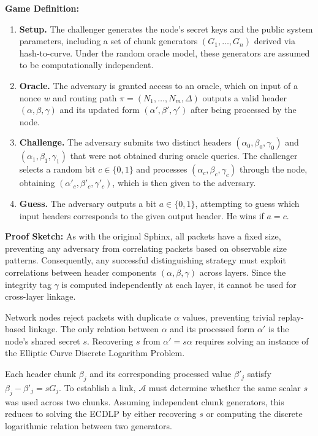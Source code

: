 \bigskip
\noindent\textbf{Game Definition:}
\begin{enumerate}[topsep=1pt, itemsep=1pt]
  \item \textbf{Setup.}
  The challenger generates the node's secret keys and the public system parameters, including a set of chunk generators $(G_1,\dots,G_n)$ derived via hash-to-curve. 
  Under the random oracle model, these generators are assumed to be computationally independent.

  \item \textbf{Oracle.}  
  The adversary is granted access to an oracle, which on input of a nonce $w$ and routing path $\pi = (N_1, \ldots, N_m, \Delta)$ outputs a valid header $(\alpha, \beta, \gamma)$ and its updated form $(\alpha', \beta', \gamma')$ after being processed by the node.

  \item \textbf{Challenge.}
  The adversary submits two distinct headers $(\alpha_0, \beta_0, \gamma_0)$ and $(\alpha_1, \beta_1, \gamma_1)$ that were not obtained during oracle queries.  
  The challenger selects a random bit $c \in \{0,1\}$ and processes $(\alpha_{c}, \beta_{c}, \gamma_{c})$ through the node, obtaining $(\alpha'_{c}, \beta'_{c}, \gamma'_{c})$, which is then given to the adversary.

  \item \textbf{Guess.}
  The adversary outputs a bit ${a} \in \{0,1\}$, attempting to guess which input headers corresponds to the given output header.  
  He wins if ${a} = {c}$.
\end{enumerate}

\medskip
\noindent\textbf{Proof Sketch:}
As with the original Sphinx, all packets have a fixed size, preventing any adversary from correlating packets based on observable size patterns.
Consequently, any successful distinguishing strategy must exploit correlations between header components $(\alpha, \beta, \gamma)$ across layers.
Since the integrity tag $\gamma$ is computed independently at each layer, it cannot be used for cross-layer linkage.

\smallskip
{}  
Network nodes reject packets with duplicate $\alpha$ values, preventing trivial replay-based linkage.
The only relation between $\alpha$ and its processed form $\alpha'$ is the node's shared secret $s$.
Recovering $s$ from $\alpha' = s\alpha$ requires solving an instance of the Elliptic Curve Discrete Logarithm Problem.

\smallskip
{}\label{sec:indep_generators}
Each header chunk $\beta_j$ and its corresponding processed value $\beta'_j$ satisfy $\beta_j-\beta'_j=sG_j$.
To establish a link, $\mathcal{A}$ must determine whether the same scalar $s$ was used across two chunks.
Assuming independent chunk generators, this reduces to solving the ECDLP by either recovering $s$ or computing the discrete logarithmic relation between two generators.

